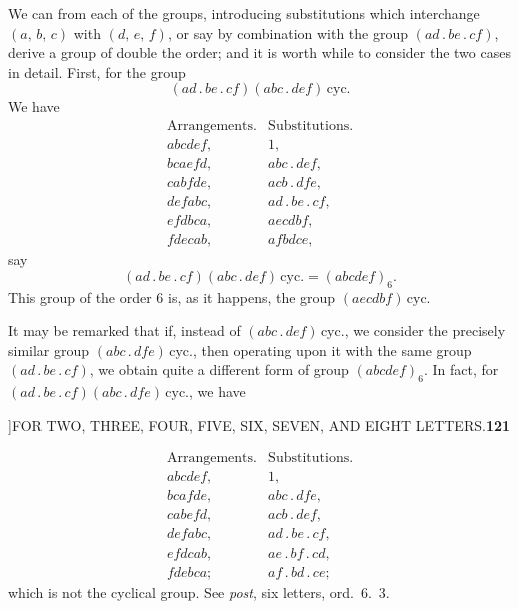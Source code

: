\documentclass[11pt]{article}
\begin{document}
\hspace{1em} We can from each of the groups, introducing substitutions which
interchange $(a,\,b,\,c)$ with $(d,\,e,\,f)$, or say by combination with the
group $(ad\,.\,be\,.\,cf)$, derive a group of double the order; and it is
worth while to consider the two cases in detail. First, for the group
\[
(ad\,.\,be\,.\,cf)(abc\,.\,def)\,\text{cyc.}
\]
We have
\[
\begin{array}{ll}
\text{Arrangements.} & \text{Substitutions.}\\
abcdef, & 1,\\
bcaefd, & abc\,.\,def,\\
cabfde, & acb\,.\,dfe,\\
defabc, & ad\,.\,be\,.\,cf,\\
efdbca, & aecdbf,\\
fdecab, & afbdce,
\end{array}
\]
say
\[
(ad\,.\,be\,.\,cf)(abc\,.\,def)\,\text{cyc.}=(abcdef)_{6}.
\]
This group of the order 6 is, as it happens, the group
$(aecdbf)\,\text{cyc.}$

\hspace{1em} It may be remarked that if, instead of
$(abc\,.\,def)\,\text{cyc.}$, we consider the precisely similar group
$(abc\,.\,dfe)\,\text{cyc.}$, then operating upon it with the same group
$(ad\,.\,be\,.\,cf)$, we obtain quite a different form of group
$(abcdef)_{6}$. In fact, for
$(ad\,.\,be\,.\,cf)(abc\,.\,dfe)\,\text{cyc.}$, we have

\newpage
{}]\hfill FOR TWO, THREE, FOUR, FIVE, SIX, SEVEN, AND EIGHT LETTERS.\hfill\textbf{121}

\smallskip
\[
\begin{array}{ll}
\text{Arrangements.} & \text{Substitutions.}\\
abcdef, & 1,\\
bcafde, & abc\,.\,dfe,\\
cabefd, & acb\,.\,def,\\
defabc, & ad\,.\,be\,.\,cf,\\
efdcab, & ae\,.\,bf\,.\,cd,\\
fdebca; & af\,.\,bd\,.\,ce;
\end{array}
\]
which is not the cyclical group. See \emph{post}, six letters, ord.\ 6.~3.
\end{document}
